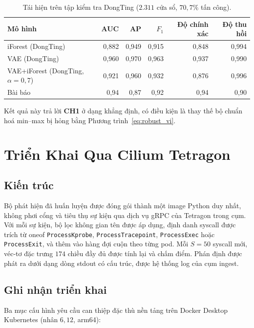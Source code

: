 \begin{table}[!t]
\centering
\caption{Tái hiện trên tập kiểm tra DongTing ($2.311$ cửa sổ,
$70{,}7\%$ tấn công).}
\label{tab:repro_vi}
\begin{tabular}{lrrrrr}
\toprule
Mô hình & AUC & AP & $F_{1}$ & Độ chính xác & Độ thu hồi \\
\midrule
iForest (DongTing)                       & 0,882 & 0,949 & 0,915 & 0,848 & 0,994 \\
VAE (DongTing)                           & 0,960 & 0,970 & 0,963 & 0,937 & 0,990 \\
VAE+iForest (DongTing, $\alpha=0{,}7$)   & 0,921 & 0,960 & 0,932 & 0,876 & 0,996 \\
\midrule
Bài báo~\cite{desfam2025}                & 0,94  & 0,87  & 0,92  & 0,94  & 0,90  \\
\bottomrule
\end{tabular}
\end{table}

Kết quả này trả lời \textbf{CH1} ở dạng khẳng định, có điều kiện là
thay thế bộ chuẩn hoá min--max bị hỏng bằng Phương trình~\ref{eq:robust_vi}.

\FloatBarrier
\section{Triển Khai Qua Cilium Tetragon}
\label{sec:deployment_vi}

\subsection{Kiến trúc}
Bộ phát hiện đã huấn luyện được đóng gói thành một image Python duy
nhất, không phơi cổng và tiêu thụ sự kiện qua dịch vụ gRPC của
Tetragon trong cụm. Với mỗi sự kiện, bộ lọc không gian tên được áp
dụng, định danh syscall được trích từ oneof \texttt{ProcessKprobe},
\texttt{ProcessTracepoint}, \texttt{ProcessExec} hoặc
\texttt{ProcessExit}, và thêm vào hàng đợi cuộn theo từng pod. Mỗi
$S=50$ syscall mới, véc-tơ đặc trưng $174$ chiều đầy đủ được tính lại
và chấm điểm. Phán định được phát ra dưới dạng dòng stdout có cấu
trúc, được hệ thống log của cụm ingest.

\subsection{Ghi nhận triển khai}
Ba mục cấu hình yêu cầu can thiệp đặc thù nền tảng trên Docker Desktop
Kubernetes (nhân $6{,}12$, arm64):

